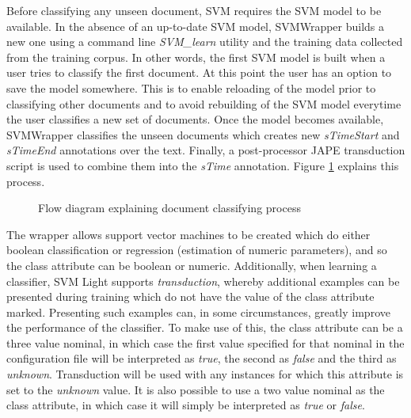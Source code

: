 Before classifying any unseen document, SVM requires the SVM model to be
available. In the absence of an up-to-date SVM model, SVMWrapper builds a new
one using a command line \textit{SVM\_learn} utility and the training data
collected from the training corpus. In other words, the first SVM model is
built when a user tries to classify the first document. At this point the user
has an option to save the model somewhere. This is to enable reloading of the
model prior to classifying other documents and to avoid rebuilding of the SVM
model everytime the user classifies a new set of documents. Once the model
becomes available, SVMWrapper classifies the unseen documents which creates
new \textit{sTimeStart} and \textit{sTimeEnd} annotations over the text.
Finally, a post-processor JAPE transduction script is used to combine them
into the \textit{sTime} annotation. Figure \ref{fig:svmclassify} explains this
process.

\begin{figure}
\caption{Flow diagram explaining document classifying process}
\label{fig:svmclassify}
\end{figure}

The wrapper allows support vector machines to be created which do either
boolean classification or regression (estimation of numeric
parameters), and so the class attribute can be boolean or
numeric. Additionally, when learning a classifier, SVM Light
supports \emph{transduction}, whereby additional examples can be
presented during training which do not have the value of the class
attribute marked. Presenting such examples can, in some circumstances,
greatly improve the performance of the classifier. To make use of
this, the class attribute can be a three value nominal, in which case
the first value specified for that nominal in the configuration file
will be interpreted as
\emph{true}, the second as \emph{false} and the third as \emph{unknown}.
Transduction will be used with any instances for which this attribute
is set to the \emph{unknown} value. It is also possible to use a two
value nominal as the class attribute, in which case it will simply be
interpreted as \emph{true} or
\emph{false}.

